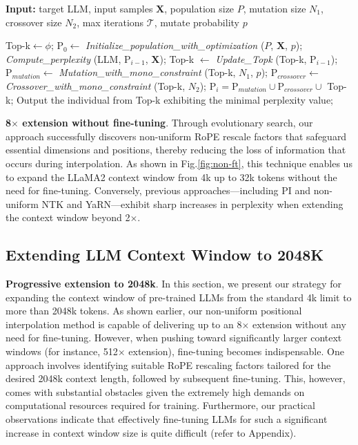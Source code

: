 \begin{algorithm}[t]
	\small
	\caption{The search algorithm}
	\textbf{Input:} target LLM, input samples $\mathbf{X}$,   population size $P$, mutation size $N_1$, crossover size $N_2$, max iterations $\mathcal{T}$, mutate probability $p$\\

	\begin{algorithmic}[1]
		\label{alg:search}
		\STATE Top-k$\leftarrow\phi$;	
		\STATE $\text{P}_0 \leftarrow$ \textit{Initialize\_population\_with\_optimization} ($P$, $\mathbf{X}$, $p$); 
		\STATE \textit{Compute\_perplexity} (LLM, $\text{P}_{i-1}$, $\mathbf{X}$);
		\STATE  Top-k $\leftarrow$ \textit{Update\_Topk} (Top-k, $\text{P}_{i-1}$);
		\STATE $\text{P}_{mutation} \leftarrow$ \textit{Mutation\_with\_mono\_constraint} (Top-k, $N_1$, $p$); 
		\STATE $\text{P}_{crossover} \leftarrow$ \textit{Crossover\_with\_mono\_constraint} (Top-k, $N_2$);
		\STATE $\text{P}_i = \text{P}_{mutation} \cup \text{P}_{crossover} \cup $ Top-k;
		\ENDFOR
		\STATE Output the individual from Top-k exhibiting the minimal perplexity value;
	\end{algorithmic}
\end{algorithm}

\textbf{8$\times$ extension without fine-tuning}. Through evolutionary search, our approach successfully discovers non-uniform RoPE rescale factors that safeguard essential dimensions and positions, thereby reducing the loss of information that occurs during interpolation. As shown in Fig.\ref{fig:non-ft}, this technique enables us to expand the LLaMA2 context window from 4k up to 32k tokens without the need for fine-tuning. Conversely, previous approaches—including PI and non-uniform NTK and YaRN—exhibit sharp increases in perplexity when extending the context window beyond 2$\times$.

\subsection{Extending LLM Context Window to 2048K}
\label{sec:extendto2048k}

\textbf{Progressive extension to 2048k}. In this section, we present our strategy for expanding the context window of pre-trained LLMs from the standard 4k limit to more than 2048k tokens. As shown earlier, our non-uniform positional interpolation method is capable of delivering up to an 8$\times$ extension without any need for fine-tuning. However, when pushing toward significantly larger context windows (for instance, 512$\times$ extension), fine-tuning becomes indispensable. One approach involves identifying suitable RoPE rescaling factors tailored for the desired 2048k context length, followed by subsequent fine-tuning. This, however, comes with substantial obstacles given the extremely high demands on computational resources required for training. Furthermore, our practical observations indicate that effectively fine-tuning LLMs for such a significant increase in context window size is quite difficult (refer to Appendix).

